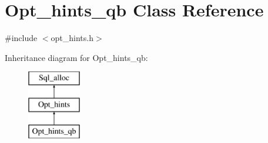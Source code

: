 \hypertarget{classOpt__hints__qb}{}\section{Opt\+\_\+hints\+\_\+qb Class Reference}
\label{classOpt__hints__qb}


{\ttfamily \#include $<$opt\+\_\+hints.\+h$>$}

Inheritance diagram for Opt\+\_\+hints\+\_\+qb\+:\begin{figure}[H]
\begin{center}
\leavevmode
\includegraphics[height=3.000000cm]{classOpt__hints__qb}
\end{center}
\end{figure}
